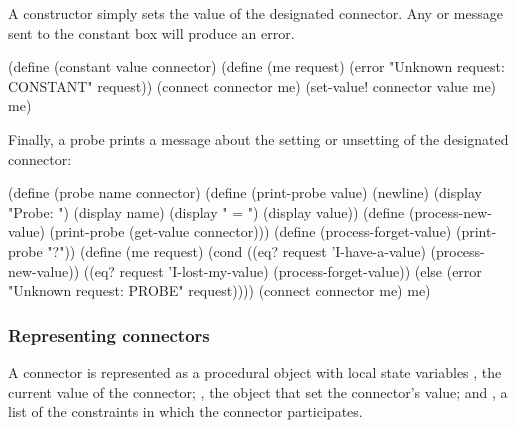 \noindent
A  constructor simply sets the value of the designated
connector.  Any  or  message sent to
the constant box will produce an error.

\begin{codeBlock}
(define (constant value connector)
  (define (me request)
    (error "Unknown request: CONSTANT" request))
  (connect connector me)
  (set-value! connector value me)
  me)
\end{codeBlock}

\noindent
Finally, a probe prints a message about the setting or unsetting of
the designated connector:

\begin{codeBlock}
(define (probe name connector)
  (define (print-probe value)
    (newline)
    (display "Probe: ")
    (display name)
    (display " = ")
    (display value))
  (define (process-new-value)
    (print-probe (get-value connector)))
  (define (process-forget-value) (print-probe "?"))
  (define (me request)
    (cond ((eq? request 'I-have-a-value)
           (process-new-value))
          ((eq? request 'I-lost-my-value)
           (process-forget-value))
          (else
            (error "Unknown request: PROBE"
                   request))))
  (connect connector me)
  me)
\end{codeBlock}

\subsubsection*{Representing connectors}

A connector is represented as a procedural object with local state variables
, the current value of the connector; , the object
that set the connector's value; and , a list of the
constraints in which the connector participates.

